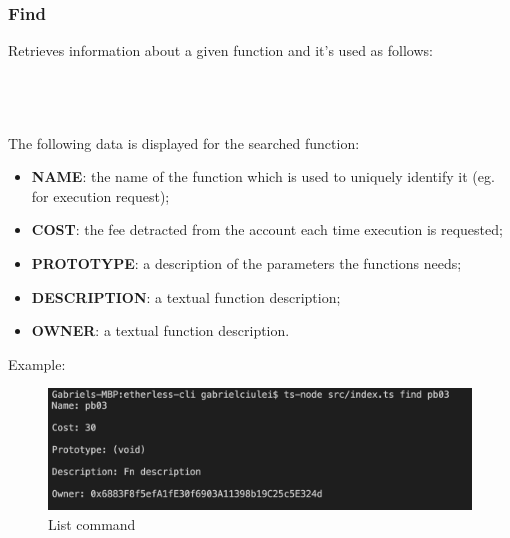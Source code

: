 \subsubsection{Find}
Retrieves information about a given function and it's used as follows:\\\\
\centerline {}\\\\
The following data is displayed for the searched function:
\begin{itemize}
	\item \textbf{NAME}: the name of the function which is used to uniquely identify it (eg. for execution request);
	\item \textbf{COST}: the fee detracted from the account each time execution is requested;
	\item \textbf{PROTOTYPE}: a description of the parameters the functions needs;
	\item \textbf{DESCRIPTION}: a textual function description;
	\item \textbf{OWNER}: a textual function description.
\end{itemize}
Example:
\begin{figure}[h]
	\begin{center}
	\includegraphics[width=\textwidth]{res/img/Screenshot_find.png}
	\caption{List command}
	\end{center}
\end{figure}
